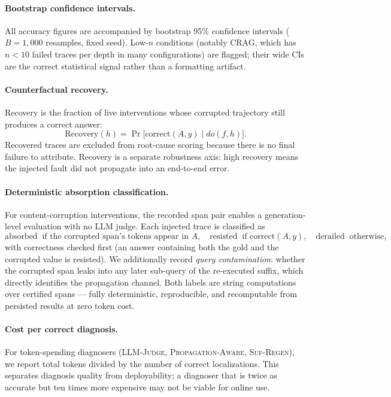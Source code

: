 \documentclass[11pt]{article}
\newcommand{\pa}{\textnormal{\textsc{Propagation-Aware}}}
\newcommand{\lj}{\textnormal{\textsc{LLM-Judge}}}
\newcommand{\sr}{\textnormal{\textsc{Suf-Regen}}}
\begin{document}
\paragraph{Bootstrap confidence intervals.}
All accuracy figures are accompanied by bootstrap 95\% confidence intervals
($B{=}1{,}000$ resamples, fixed seed).  Low-$n$ conditions (notably CRAG, which
has $n < 10$ failed traces per depth in many configurations) are flagged; their
wide CIs are the correct statistical signal rather than a formatting artifact.

\paragraph{Counterfactual recovery.}
Recovery is the fraction of live interventions whose corrupted trajectory still
produces a correct answer:
\[
  \mathrm{Recovery}(h) =
  \Pr\bigl[\mathrm{correct}(A, y) \mid do(f, h)\bigr].
\]
Recovered traces are excluded from root-cause scoring because there is no final
failure to attribute.  Recovery is a separate robustness axis: high recovery
means the injected fault did not propagate into an end-to-end error.

\paragraph{Deterministic absorption classification.}
For content-corruption interventions, the recorded span pair enables a
generation-level evaluation with no LLM judge.  Each injected trace is
classified as
\[
  \mathrm{absorbed} \;\;\text{if the corrupted span's tokens appear in } A,
  \quad
  \mathrm{resisted} \;\;\text{if } \mathrm{correct}(A, y),
  \quad
  \mathrm{derailed} \;\;\text{otherwise},
\]
with correctness checked first (an answer containing both the gold and the
corrupted value is resisted).  We additionally record \emph{query
contamination}: whether the corrupted span leaks into any later sub-query of
the re-executed suffix, which directly identifies the propagation channel.
Both labels are string computations over certified spans --- fully
deterministic, reproducible, and recomputable from persisted results at zero
token cost.

\paragraph{Cost per correct diagnosis.}
For token-spending diagnosers (\lj, \pa, \sr), we report total tokens divided
by the number of correct localizations.  This separates diagnosis quality from
deployability; a diagnoser that is twice as accurate but ten times more expensive
may not be viable for online use.
\end{document}
